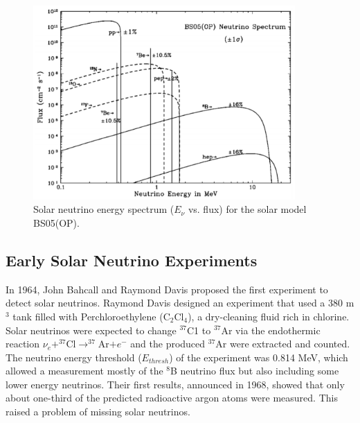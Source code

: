 \begin{figure}[htbp]
	\centering	
	\includegraphics[width=10cm]{BP05.pdf}
	\caption{ Solar neutrino energy spectrum ($E_\nu$ vs. flux) for the solar model BS05(OP)\cite{BP05}.}
	\label{bp05plot}
\end{figure}

\subsection{Early Solar Neutrino Experiments}
In 1964, John Bahcall and Raymond Davis proposed the first experiment to detect solar neutrinos\cite{bahcall1,raymond}. Raymond Davis designed an experiment that used a 380 m$^3$ tank filled with Perchloroethylene (C$_2$Cl$_4$), a dry-cleaning fluid rich in chlorine. Solar neutrinos were expected to change $^{37}$C1 to $^{37}$Ar via the endothermic reaction $\nu_e+^{37}$Cl$\to^{37}$Ar$+e^-$ and the produced $^{37}$Ar were extracted and counted. The neutrino energy threshold ($E_{thresh}$) of the experiment was 0.814 MeV, which allowed a measurement mostly of the $^8$B neutrino flux but also including some lower energy neutrinos\cite{raymond}. Their first results, announced in 1968, showed that only about one-third of the predicted radioactive argon atoms were measured. This raised a problem of missing solar neutrinos.

